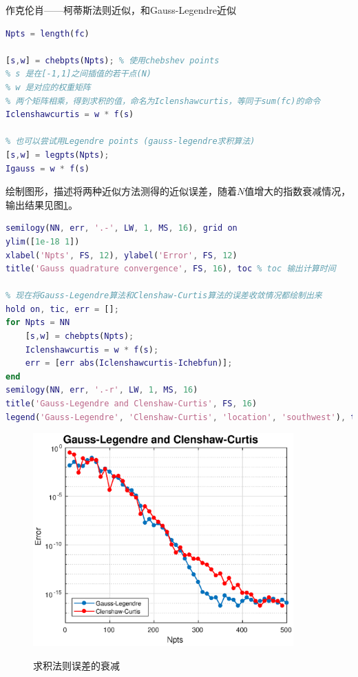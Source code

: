 作克伦肖——柯蒂斯法则近似，和Gauss-Legendre近似\citep{Glaser:2007ky}
\begin{lstlisting}[language=Matlab]
% 求积近似过程中，使用了多少插值点
Npts = length(fc)

[s,w] = chebpts(Npts); % 使用chebshev points
% s 是在[-1,1]之间插值的若干点(N)
% w 是对应的权重矩阵
% 两个矩阵相乘，得到求积的值，命名为Iclenshawcurtis，等同于sum(fc)的命令
Iclenshawcurtis = w * f(s)

% 也可以尝试用Legendre points (gauss-legendre求积算法)
[s,w] = legpts(Npts);
Igauss = w * f(s)
\end{lstlisting}

绘制图形，描述将两种近似方法测得的近似误差，随着$N$值增大的指数衰减情况，输出结果见图\ref{fig:ninc-cc-code-f-error}。
\begin{lstlisting}[language=Matlab]
% 绘出采用Gauss-legendre算法，误差项的收敛情况. semilogy与plot命令类似，除了similogy输出log形式的值
semilogy(NN, err, '.-', LW, 1, MS, 16), grid on
ylim([1e-18 1])
xlabel('Npts', FS, 12), ylabel('Error', FS, 12)
title('Gauss quadrature convergence', FS, 16), toc % toc 输出计算时间

% 现在将Gauss-Legendre算法和Clenshaw-Curtis算法的误差收敛情况都绘制出来
hold on, tic, err = [];
for Npts = NN
    [s,w] = chebpts(Npts);
    Iclenshawcurtis = w * f(s);
    err = [err abs(Iclenshawcurtis-Ichebfun)];
end
semilogy(NN, err, '.-r', LW, 1, MS, 16)
title('Gauss-Legendre and Clenshaw-Curtis', FS, 16)
legend('Gauss-Legendre', 'Clenshaw-Curtis', 'location', 'southwest'), toc
\end{lstlisting}


\begin{figure}[htbp]
   \caption{求积法则误差的衰减}
  \centering
  \includegraphics[width=10cm]{./Figures/20180308-quadrature-rules-error.eps}
  \label{fig:ninc-cc-code-f-error}
%
\end{figure}
